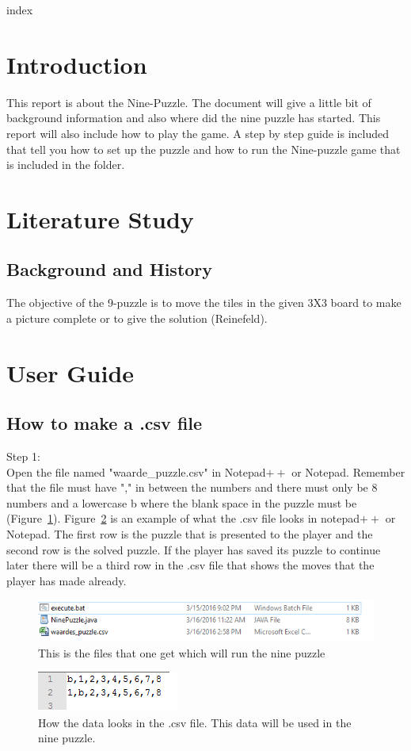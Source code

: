 \documentclass[10pt]{article}
\begin{document}

\newpage
index
\newpage
\section{Introduction}
This report is about the Nine-Puzzle.  The document will give a little bit of background information and also where did the nine puzzle has started.  This report will also include how to play the game. A step by step guide is included that tell you how to set up the puzzle and how to run the Nine-puzzle game that is included in the folder.

\section{Literature Study}
\subsection{Background and History}
The objective of the 9-puzzle is to move the tiles in the given 3X3 board to make a picture complete or to give the solution (Reinefeld).
\section{User Guide}
\subsection{How to make a .csv file}
Step 1:
\\Open the file named "waarde\_puzzle.csv" in Notepad$++$ or Notepad.
Remember that the file must have "," in between the numbers and there must only be 8 numbers and a lowercase b where the blank space in the puzzle must be (Figure~\ref{csv}).
Figure~\ref{waardes} is an example of what the .csv file looks in notepad$++$ or Notepad. The first row is the puzzle that is presented to the player and the second row is the solved puzzle.  If the player has saved its puzzle to continue later there will be a third row in the .csv file that shows the moves that the player has made already.
\begin{figure}
\centering
\includegraphics[scale=0.7]{./Prente/csv.png}
\caption{This is the files that one get which will run the nine puzzle}
\label{csv}
\end{figure}
\begin{figure}
\centering
\includegraphics[scale=1]{./Prente/waardes.png}
\caption{How the data looks in the .csv file.  This data will be used in the nine puzzle.}
\label{waardes}
\end{figure}
\end{document}
